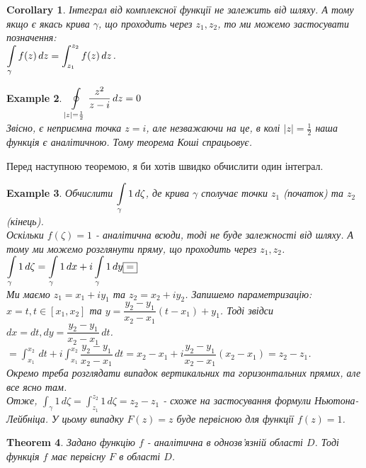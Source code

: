 \documentclass[a4paper, 10pt]{article}
\theoremstyle{theoremdd}
\newtheorem{theorem}{Theorem}[subsection]
\theoremstyle{theoremdd}
\theoremstyle{theoremdd}
\theoremstyle{theoremdd}
\newtheorem{example}[theorem]{Example}
\theoremstyle{theoremdd}
\theoremstyle{theoremdd}
\theoremstyle{theoremdd}
\theoremstyle{theoremdd}
\newtheorem{corollary}[theorem]{Corollary}
\begin{document}
\begin{corollary}
Інтеграл від комплексної функції не залежить від шляху. А тому якщо є якась крива $\gamma$, що проходить через $z_1,z_2$, то ми можемо застосувати позначення:\\
$\displaystyle\int\displaylimits_\gamma f(z)\,dz = \int_{z_1}^{z_2} f(z)\,dz$.
\end{corollary}

\begin{example}
$\displaystyle \oint\displaylimits_{|z| = \frac{1}{2}} \frac{z^2}{z-i}\,dz = 0$\\
Звісно, є неприємна точка $z = i$, але незважаючи на це, в колі $\displaystyle |z|=\frac{1}{2}$ наша функція є аналітичною. Тому теорема Коші спрацьовує.
\end{example}

Перед наступною теоремою, я би хотів швидко обчислити один інтеграл.

\begin{example}
Обчислити $\displaystyle\int\displaylimits_\gamma 1\,d\zeta$, де крива $\gamma$ сполучає точки $z_1$ (початок) та $z_2$ (кінець).\\
Оскільки $f(\zeta) = 1$ - аналітична всюди, тоді не буде залежності від шляху. А тому ми можемо розглянути пряму, що проходить через $z_1,z_2$.\\
$\displaystyle\int\displaylimits_\gamma 1\,d\zeta = \int\displaylimits_\gamma 1 \,dx + i \int\displaylimits_\gamma 1\,dy \boxed{=}$\\
Ми маємо $z_1 = x_1+iy_1$ та $z_2 = x_2+iy_2$. Запишемо параметризацію:\\
$x = t, t \in [x_1,x_2]$ та $y = \dfrac{y_2-y_1}{x_2-x_1}(t-x_1) + y_1$. Тоді звідси $dx = dt, dy = \dfrac{y_2-y_1}{x_2-x_1}\,dt$.\\
$\boxed{=} \displaystyle\int_{x_1}^{x_2}\,dt + i \int_{x_1}^{x_2} \dfrac{y_2-y_1}{x_2-x_1}\,dt = x_2-x_1 + i \dfrac{y_2-y_1}{x_2-x_1}(x_2-x_1) = z_2 - z_1$.\\
Окремо треба розглядати випадок вертикальних та горизонтальних прямих, але все ясно там.\\
Отже, $\displaystyle\int_\gamma 1\,d\zeta = \int_{z_1}^{z_2} 1\,d\zeta = z_2-z_1$ - схоже на застосування формули Ньютона-Лейбніца. У цьому випадку $F(z) = z$ буде первісною для функції $f(z) = 1$.
\end{example}

\begin{theorem}
Задано функцію $f$ - аналітична в однозв'язній області $D$. Тоді функція $f$ має первісну $F$ в області $D$.
\end{theorem}
\end{document}
